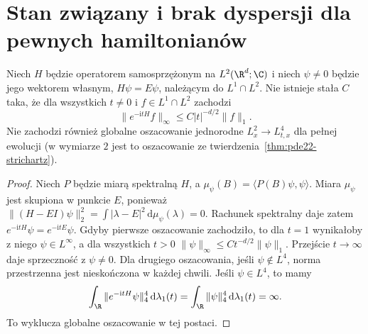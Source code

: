 \section{Stan związany i brak dyspersji dla pewnych hamiltonianów}
\begin{stwierdzenie}
Niech $H$ będzie operatorem samosprzężonym na
$L^2(\R^d;\C)$ i niech $\psi\ne0$ będzie jego
wektorem własnym, $H\psi=E\psi$, należącym
do $L^1\cap L^2$. Nie istnieje stała $C$ taka, że
dla wszystkich $t\ne0$ i $f\in L^1\cap L^2$
zachodzi
\[
 \|e^{-\mathrm itH}f\|_\infty\le C|t|^{-d/2}\|f\|_1 .
\]
Nie zachodzi również globalne oszacowanie
jednorodne $L^2_x\to L^4_{t,x}$ dla pełnej
ewolucji (w wymiarze $2$ jest to oszacowanie
ze twierdzenia~\ref{thm:pde22-strichartz}).
\end{stwierdzenie}
\begin{proof}
Niech $P$ będzie miarą spektralną $H$,
a $\mu_\psi(B)=\langle P(B)\psi,\psi\rangle$.
Miara $\mu_\psi$ jest skupiona w punkcie $E$,
ponieważ
$\|(H-EI)\psi\|_2^2=\int|\lambda-E|^2\,
\mathrm d\mu_\psi(\lambda)=0$.
Rachunek spektralny daje zatem
$e^{-\mathrm itH}\psi=e^{-\mathrm itE}\psi$.
Gdyby pierwsze oszacowanie zachodziło, to dla
$t=1$ wynikałoby z niego $\psi\in L^\infty$,
a dla wszystkich $t>0$
$\|\psi\|_\infty\le Ct^{-d/2}\|\psi\|_1$.
Przejście $t\to\infty$ daje sprzeczność z
$\psi\ne0$. Dla drugiego oszacowania, jeśli $\psi\notin L^4$,
norma przestrzenna jest nieskończona w każdej
chwili. Jeśli $\psi\in L^4$, to mamy
\[
 \int_\R\|e^{-\mathrm itH}\psi\|_4^4\,
                \mathrm d\lambda_1(t)
 =\int_\R\|\psi\|_4^4\,\mathrm d\lambda_1(t)=\infty.
\]
To wyklucza globalne oszacowanie w tej postaci.
\end{proof}

